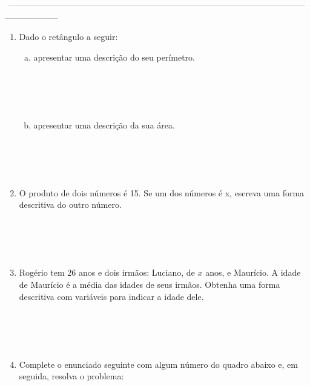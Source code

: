 \documentclass[a4paper,14pt]{article}
\begin{document}
\noindent\textsubscript{~-----------------------------------------------------------------------------------------------------------------------------------------------------}
	\begin{multicols}{2}
    	\begin{enumerate}
    		\item Dado o retângulo a seguir:
    		\begin{enumerate}[a)]
    			\item apresentar uma descrição do seu perímetro. \\\\\\\\\\
    			\item apresentar uma descrição da sua área. \\\\\\\\\\
    		\end{enumerate}
    		\item O produto de dois números é 15. Se um dos números é x, escreva uma forma descritiva do outro número. \\\\\\\\\\
    		\item Rogério tem 26 anos e dois irmãos: Luciano, de $x$ anos, e Maurício. A idade de Maurício é a média das idades de seus irmãos. Obtenha uma forma descritiva com variáveis para indicar a idade dele. \\\\\\\\\\
    		\item Complete o enunciado seguinte com algum número do quadro abaixo e, em seguida, resolva o problema:
    		

\end{enumerate}
\end{multicols}
\end{document}
